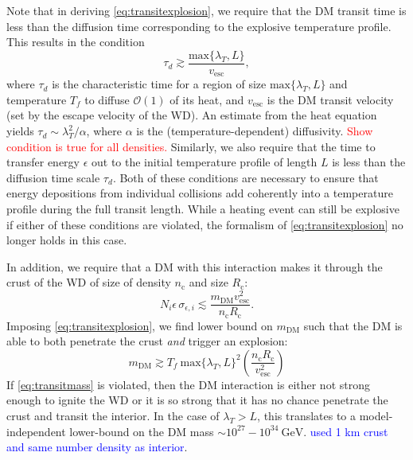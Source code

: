 \documentclass[twocolumn,showpacs,preprintnumbers,amsmath,amssymb,prd]{revtex4}
\newcommand{\OO}{\mathcal{O}}
\newcommand{\GeV}{\text{GeV}}
\def\r{\right)}
\def\l{\left(}
\begin{document}
Note that in deriving \eqref{eq:transitexplosion}, we require that the DM transit time is less than the diffusion time corresponding to the explosive temperature profile. This results in the condition
\begin{equation}
\tau_d \gtrsim \frac{\text{max}\{\lambda_T, L\}}{v_\text{esc}},
\end{equation}
where $\tau_d$ is the characteristic time for a region of size $\text{max}\{\lambda_T, L\}$ and temperature $T_f$ to diffuse $\OO(1)$ of its heat, and $v_\text{esc}$ is the DM transit velocity (set by the escape velocity of the WD). An estimate from the heat equation yields $\tau_d \sim \lambda_T^2/\alpha$, where $\alpha$ is the (temperature-dependent) diffusivity. \textcolor{red}{Show condition is true for all densities.} Similarly, we also require that the time to transfer energy $\epsilon$ out to the initial temperature profile of length $L$ is less than the diffusion time scale $\tau_d$. Both of these conditions are necessary to ensure that energy depositions from individual collisions add coherently into a temperature profile during the full transit length. While a heating event can still be explosive if either of these conditions are violated, the formalism of \eqref{eq:transitexplosion} no longer holds in this case.

In addition, we require that a DM with this interaction makes it through the crust of the WD of size of density $n_{\text{c}}$ and size $R_{\text{c}}$:
\begin{equation}
N_i\epsilon\, \sigma_{\epsilon,i} \lesssim \frac{m_{\text{DM}} v_{\text{esc}}^2}{n_{\text{c}} R_{\text{c}}}.
\end{equation}
Imposing \eqref{eq:transitexplosion}, we find lower bound on $m_{\text{DM}}$ such that the DM is able to both penetrate the crust \emph{and} trigger an explosion:
\begin{equation}
\label{eq:transitmass}
m_{\text{DM}} \gtrsim  T_f ~\text{max}\{\lambda_T, L\}^2 \l \frac{n_{\text{c}} R_{\text{c}}}{v_{\text{esc}}^2} \r
\end{equation}
If \eqref{eq:transitmass} is violated, then the DM interaction is either not strong enough to ignite the WD or it is so strong that it has no chance penetrate the crust and transit the interior. In the case of $\lambda_T > L$, this translates to a model-independent lower-bound on the DM mass $\sim 10^{27} - 10^{34} ~\GeV$. \textcolor{blue}{used 1 km crust and same number density as interior}.
\end{document}
